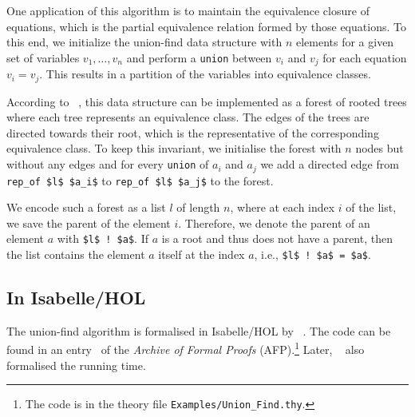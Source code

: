 \documentclass[
  sigplan,
  10pt,
  anonymous,
  review,
  ]{acmart}
\begin{document}
One application of this algorithm is to maintain the equivalence closure of equations, which is the partial equivalence relation formed by those equations.
To this end, we initialize the union-find data structure with $n$ elements for a given set of variables $v_1, \ldots, v_n$ and perform a \lstinline!union! between $v_i$ and $v_j$ for each equation $v_i = v_j$.
This results in a partition of the variables into equivalence classes.

According to \citeauthor{unionfind_tarjan}~\cite{unionfind_tarjan}, this data structure can be implemented as a forest of rooted trees where each tree represents an equivalence class.
The edges of the trees are directed towards their root, which is the representative of the corresponding equivalence class.
To keep this invariant, we initialise the forest with $n$ nodes but without any edges and for every \lstinline!union! of $a_i$ and $a_j$ we add a directed edge from \lstinline!rep_of $l$ $a_i$! to \lstinline!rep_of $l$ $a_j$! to the forest.

We encode such a forest as a list $l$ of length $n$, where at each index $i$ of the list, we save the parent of the element $i$.
Therefore, we denote the parent of an element $a$ with \lstinline|$l$ ! $a$|.
If $a$ is a root and thus does not have a parent, then the list contains the element $a$ itself at the index $a$, i.e., \lstinline|$l$ ! $a$ = $a$|.


\subsection{In Isabelle/HOL}
The union-find algorithm is formalised in Isabelle/HOL by \citeauthor{unionfind_isabelle}~\cite{unionfind_isabelle}.
The code can be found in an entry~\cite{union_find_afp} of the \emph{Archive of Formal Proofs} (AFP).\footnote{The code is in the theory file \texttt{Examples/Union\_Find.thy}.}
Later, \citeauthor{union_find_imp_hol}~\cite{union_find_imp_hol} also formalised the running time.
\end{document}
